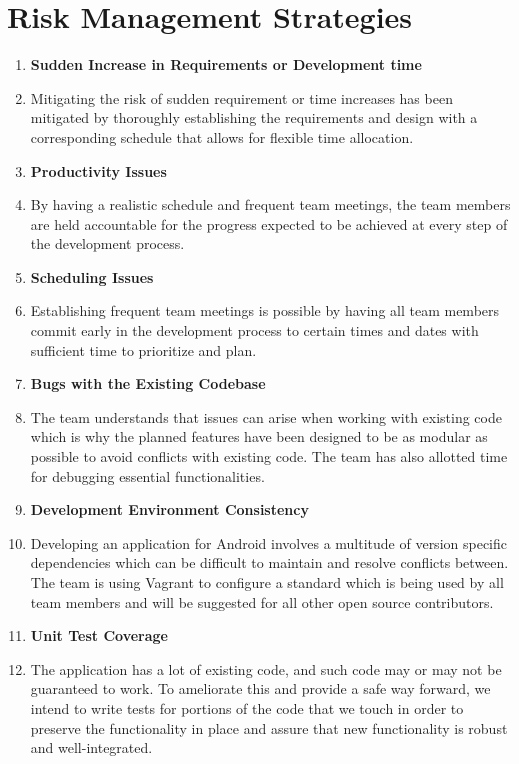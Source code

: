 \documentclass{scrreprt}
\begin{document}
\section{Risk Management Strategies}
\begin{enumerate}
	\item[] \textbf{Sudden Increase in Requirements or Development time}
	\item Mitigating the risk of sudden requirement or time increases has been mitigated by thoroughly establishing the requirements and design with a corresponding schedule that allows for flexible time allocation.
	\item[] \textbf{Productivity Issues}
	\item By having a realistic schedule and frequent team meetings, the team members are held accountable for the progress expected to be achieved at every step of the development process.

	\item[] \textbf{Scheduling Issues}
	\item Establishing frequent team meetings is possible by having all team members commit early in the development process to certain times and dates with sufficient time to prioritize and plan.

	\item[] \textbf{Bugs with the Existing Codebase}
	\item The team understands that issues can arise when working with existing code which is why the planned features have been designed to be as modular as possible to avoid conflicts with existing code. The team has also allotted time for debugging essential functionalities.
	
\pagebreak

	\item[] \textbf{Development Environment Consistency}
	\item Developing an application for Android involves a multitude of version specific dependencies which can be difficult to maintain and resolve conflicts between. The team is using Vagrant to configure a standard which is being used by all team members and will be suggested for all other open source contributors.

	\item[] \textbf{Unit Test Coverage}
	\item The application has a lot of existing code, and such code may or may not be guaranteed to work. To ameliorate this and provide a safe way forward, we intend to write tests for portions of the code that we touch in order to preserve the functionality in place and assure that new functionality is robust and well-integrated.
	

\end{enumerate}
\end{document}
